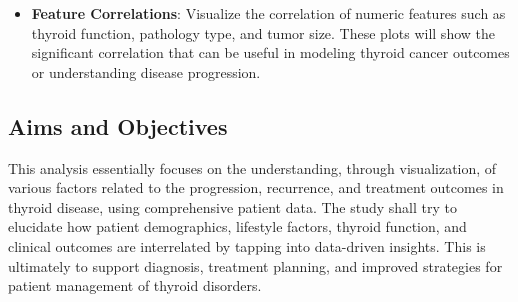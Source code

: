 \documentclass[12pt]{article}
\begin{document}
\begin{itemize}
\item \textbf{Feature Correlations}: Visualize the correlation of numeric features such as thyroid function, pathology type, and tumor size. These plots will show the significant correlation that can be useful in modeling thyroid cancer outcomes or understanding disease progression.
\end{itemize}


\subsection{Aims and Objectives}
This analysis essentially focuses on the understanding, through visualization, of various factors related to the progression, recurrence, and treatment outcomes in thyroid disease, using comprehensive patient data. The study shall try to elucidate how patient demographics, lifestyle factors, thyroid function, and clinical outcomes are interrelated by tapping into data-driven insights. This is ultimately to support diagnosis, treatment planning, and improved strategies for patient management of thyroid disorders.
\newpage
\end{document}
